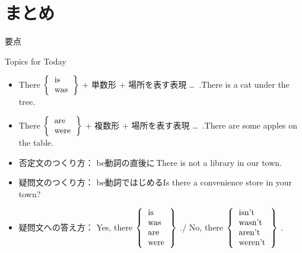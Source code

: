 \documentclass[aspectratio=169,xcolor={dvipsnames,table}]{beamer}
\begin{document}
\section{まとめ}
\begin{frame}[plain]{要点}

\begin{exampleblock}{Topics for Today}
 \begin{itemize}[square]\small
 \item There $\left\{
              \begin{tabular}{l}
              {is}\\
              {was}
              \end{tabular}
\right\}$ $+$ 単数形 $+$ 場所を表す表現 \ldots\,\,\,.\hfill{\scriptsize There is a cat under the tree.}
 \item There $\left\{
              \begin{tabular}{l}
              {are}\\
              {were}
              \end{tabular}
\right\}$ $+$ 複数形 $+$ 場所を表す表現 \ldots\,\,\,.\hfill{\scriptsize There are some apples on the table.}
 \item 否定文のつくり方： be動詞の直後に\,\hfill{}{\scriptsize There is not a library in our town.}
  \item 疑問文のつくり方： be動詞ではじめる\hfill{}{\scriptsize Is there a convenience store in your town?}
  \item 疑問文への答え方： Yes, there $\left\{
              \begin{tabular}{l}
              is\\
              was\\
              {are}\\
              {were}
              \end{tabular}
\right\}$ .\hfill{}/\hfill
No, there $\left\{
              \begin{tabular}{l}
              isn't\\
              wasn't\\
              {aren't}\\
              {weren't}
              \end{tabular}
\right\}$ .\hfill{}\mbox{}
\end{itemize}
\end{exampleblock}
\end{frame}
\end{document}
